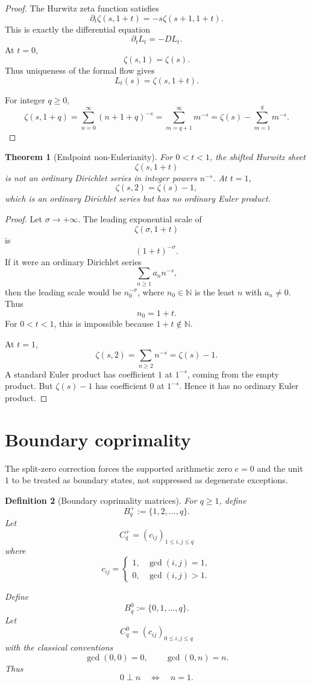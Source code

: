 \documentclass[11pt]{article}
\newtheorem{theorem}{Theorem}[section]
\newtheorem{definition}[theorem]{Definition}
\newcommand{\NN}{\mathbb N}
\begin{document}
\begin{proof}
The Hurwitz zeta function satisfies
\[
\partial_t\zeta(s,1+t)
=
-s\zeta(s+1,1+t).
\]
This is exactly the differential equation
\[
\partial_tL_t=-DL_t.
\]
At \(t=0\),
\[
\zeta(s,1)=\zeta(s).
\]
Thus uniqueness of the formal flow gives
\[
L_t(s)=\zeta(s,1+t).
\]

For integer \(q\ge0\),
\[
\zeta(s,1+q)
=
\sum_{n=0}^\infty(n+1+q)^{-s}
=
\sum_{m=q+1}^\infty m^{-s}
=
\zeta(s)-\sum_{m=1}^q m^{-s}.
\]
\end{proof}

\begin{theorem}[Endpoint non-Eulerianity]
For \(0<t<1\), the shifted Hurwitz sheet
\[
\zeta(s,1+t)
\]
is not an ordinary Dirichlet series in integer powers \(n^{-s}\). At \(t=1\),
\[
\zeta(s,2)=\zeta(s)-1,
\]
which is an ordinary Dirichlet series but has no ordinary Euler product.
\end{theorem}

\begin{proof}
Let \(\sigma\to+\infty\). The leading exponential scale of
\[
\zeta(\sigma,1+t)
\]
is
\[
(1+t)^{-\sigma}.
\]
If it were an ordinary Dirichlet series
\[
\sum_{n\ge1}a_n n^{-s},
\]
then the leading scale would be \(n_0^{-\sigma}\), where \(n_0\in\NN\) is the least \(n\) with \(a_n\neq0\). Thus
\[
n_0=1+t.
\]
For \(0<t<1\), this is impossible because \(1+t\notin\NN\).

At \(t=1\),
\[
\zeta(s,2)=\sum_{n\ge2}n^{-s}=\zeta(s)-1.
\]
A standard Euler product has coefficient \(1\) at \(1^{-s}\), coming from the empty product. But \(\zeta(s)-1\) has coefficient \(0\) at \(1^{-s}\). Hence it has no ordinary Euler product.
\end{proof}

\section{Boundary coprimality}

The split-zero correction forces the supported arithmetic zero \(e=0\) and the unit \(1\) to be treated as boundary states, not suppressed as degenerate exceptions.

\begin{definition}[Boundary coprimality matrices]
For \(q\ge1\), define
\[
B_q^+:=\{1,2,\dots,q\}.
\]
Let
\[
C_q^+=(c_{ij})_{1\le i,j\le q}
\]
where
\[
c_{ij}=
\begin{cases}
1,&\gcd(i,j)=1,\\
0,&\gcd(i,j)>1.
\end{cases}
\]

Define
\[
B_q^0:=\{0,1,\dots,q\}.
\]
Let
\[
C_q^0=(c_{ij})_{0\le i,j\le q}
\]
with the classical conventions
\[
\gcd(0,0)=0,\qquad \gcd(0,n)=n.
\]
Thus
\[
0\perp n
\quad\Longleftrightarrow\quad
n=1.
\]
\end{definition}
\end{document}
